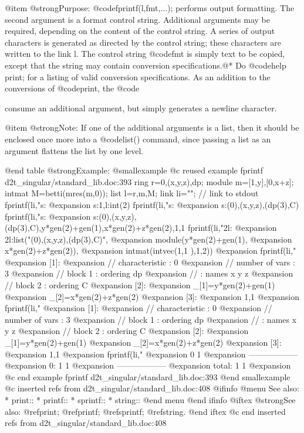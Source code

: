 @item @strong{Purpose:}
@code{fprintf(l,fmt,...);} performs output formatting.
The second argument is a format control string. Additional
arguments may be required, depending on the content of the
control string. A series of output characters is generated as
directed by the control string; these characters are
written to the link l.
The control string @code{fmt} is simply text to be copied, except
that the string may contain conversion specifications.@*
Do @code{help print;} for a listing of valid conversion
specifications. As an addition to the conversions of @code{print},
the @code{%
consume an additional argument, but simply generates a newline
character.

@item @strong{Note:}
If one of the additional arguments is a list, then it should be
enclosed once more into a @code{list()} command, since passing
a list as an argument flattens the list by one level.

@end table
@strong{Example:}
@smallexample
@c reused example fprintf d2t_singular/standard_lib.doc:393 
  ring r=0,(x,y,z),dp;
module m=[1,y],[0,x+z];
intmat M=betti(mres(m,0));
list l=r,m,M;
link li="";   // link to stdout
fprintf(li,"s:%
@expansion{} s:1,l:int(2)
fprintf(li,"s:%
@expansion{} s:(0),(x,y,z),(dp(3),C)
fprintf(li,"s:%
@expansion{} s:(0),(x,y,z),(dp(3),C),y*gen(2)+gen(1),x*gen(2)+z*gen(2),1,1 
fprintf(li,"2l:%
@expansion{} 2l:list("(0),(x,y,z),(dp(3),C)",
@expansion{} module(y*gen(2)+gen(1),
@expansion{} x*gen(2)+z*gen(2)),
@expansion{} intmat(intvec(1,1 ),1,2))
@expansion{} 
fprintf(li,"%
@expansion{} [1]:
@expansion{}    //   characteristic : 0
@expansion{} //   number of vars : 3
@expansion{} //        block   1 : ordering dp
@expansion{} //                  : names    x y z 
@expansion{} //        block   2 : ordering C
@expansion{} [2]:
@expansion{}    _[1]=y*gen(2)+gen(1)
@expansion{}    _[2]=x*gen(2)+z*gen(2)
@expansion{} [3]:
@expansion{}    1,1 
@expansion{} 
fprintf(li,"%
@expansion{} [1]:
@expansion{}    //   characteristic : 0
@expansion{} //   number of vars : 3
@expansion{} //        block   1 : ordering dp
@expansion{} //                  : names    x y z 
@expansion{} //        block   2 : ordering C
@expansion{} [2]:
@expansion{}    _[1]=y*gen(2)+gen(1)
@expansion{}    _[2]=x*gen(2)+z*gen(2)
@expansion{} [3]:
@expansion{}    1,1 
@expansion{} 
fprintf(li,"%
@expansion{}            0     1
@expansion{} ------------------
@expansion{}     0:     1     1
@expansion{} ------------------
@expansion{} total:     1     1
@expansion{} 
@c end example fprintf d2t_singular/standard_lib.doc:393
@end smallexample
@c inserted refs from d2t_singular/standard_lib.doc:408
@ifinfo
@menu
See also:
* print::
* printf::
* sprintf::
* string::
@end menu
@end ifinfo
@iftex
@strong{See also:}
@ref{print};
@ref{printf};
@ref{sprintf};
@ref{string}.
@end iftex
@c end inserted refs from d2t_singular/standard_lib.doc:408

}
